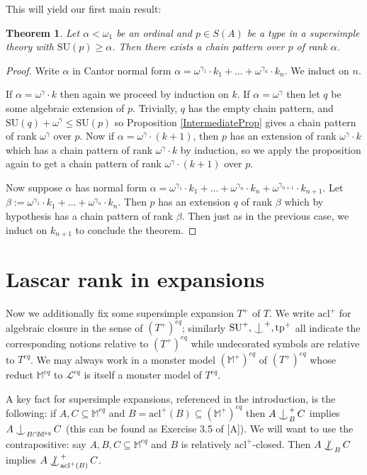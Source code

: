 \documentclass{article}
\DeclareMathOperator{\Ind}{Ind}
\DeclareMathOperator{\tp}{tp}
\def\Ind#1#2{#1\setbox0=\hbox{$#1x$}\kern\wd0\hbox to 0pt{\hss$#1\mid$\hss}
\lower.9\ht0\hbox to 0pt{\hss$#1\smile$\hss}\kern\wd0}
\def\ind{\mathop{\mathpalette\Ind{}}}
\def\notind#1#2{#1\setbox0=\hbox{$#1x$}\kern\wd0
\hbox to 0pt{\mathchardef\nn=12854\hss$#1\nn$\kern1.4\wd0\hss}
\hbox to 0pt{\hss$#1\mid$\hss}\lower.9\ht0 \hbox to 0pt{\hss$#1\smile$\hss}\kern\wd0}
\def\nind{\mathop{\mathpalette\notind{}}}
\newtheorem{theorem}{Theorem}[section]
\theoremstyle{remark}
\theoremstyle{definition}
\begin{document}
This will yield our first main result:
\begin{theorem}\label{ChainThm}
    Let $\alpha<\omega_1$ be an ordinal and $p\in S(A)$ be a type in a supersimple theory with $\mathrm{SU}(p)\geq\alpha$. Then there exists a chain pattern over $p$ of rank $\alpha$.
\end{theorem}
\begin{proof}
    Write $\alpha$ in Cantor normal form $\alpha=\omega^{\gamma_1}\cdot k_1+\dots+\omega^{\gamma_n}\cdot k_n$. We induct on $n$.

    If $\alpha=\omega^{\gamma}\cdot k$ then again we proceed by induction on $k$. If $\alpha=\omega^{\gamma}$ then let $q$ be some algebraic extension of $p$. Trivially, $q$ has the empty chain pattern, and $\mathrm{SU}(q)+\omega^\gamma\leq \mathrm{SU}(p)$ so Proposition \ref{IntermediateProp} gives a chain pattern of rank $\omega^\gamma$ over $p$. Now if $\alpha=\omega^\gamma\cdot (k+1)$, then $p$ has an extension of rank $\omega^\gamma\cdot k$ which has a chain pattern of rank $\omega^\gamma\cdot k$ by induction, so we apply the proposition again to get a chain pattern of rank $\omega^\gamma\cdot(k+1)$ over $p$.

    Now suppose $\alpha$ has normal form $\alpha=\omega^{\gamma_1}\cdot k_1+\dots+\omega^{\gamma_n}\cdot k_n+\omega^{\gamma_{n+1}}\cdot k_{n+1}$. Let $\beta:=\omega^{\gamma_1}\cdot k_1+\dots+\omega^{\gamma_n}\cdot k_n$. Then $p$ has an extension $q$ of rank $\beta$ which by hypothesis has a chain pattern of rank $\beta$. Then just as in the previous case, we induct on $k_{n+1}$ to conclude the theorem.
\end{proof}

\section{Lascar rank in expansions}\label{ChainConclusionSection}
Now we additionally fix some supersimple expansion $T^+$ of $T$. We write $\mathrm{acl}^+$ for algebraic closure in the sense of $(T^+)^{eq}$; similarly $\mathrm{SU}^+, \ind^+, \tp^+$ all indicate the corresponding notions relative to $(T^+)^{eq}$ while undecorated symbols are relative to $T^{eq}$. We may always work in a monster model $(\mathbb{M}^+)^{eq}$ of $(T^+)^{eq}$ whose reduct $\mathbb{M}^{eq}$ to $\mathcal{L}^{eq}$ is itself a monster model of $T^{eq}$.

A key fact for supersimple expansions, referenced in the introduction, is the following: if $A,C\subseteq \mathbb{M}^{eq}$ and $B=\mathrm{acl}^+(B)\subseteq (\mathbb{M}^+)^{eq}$ then $A\ind^+_BC$ implies $A\ind_{B\cap \mathbb{M}^{eq}} C$ (this can be found as Exercise 3.5 of [A]). We will want to use the contrapositive: say $A,B,C\subseteq \mathbb{M}^{eq}$ and $B$ is relatively $\mathrm{acl}^+$-closed. Then $A\nind_BC$ implies $A\nind_{\mathrm{acl}^+(B)}^+C$. 
\end{document}
